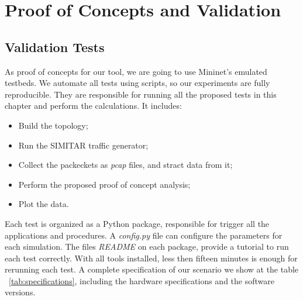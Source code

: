 \chapter{Proof of Concepts and Validation}\label{ch:validation}


\section{Validation Tests}


As proof of concepts for our tool, we are going to use Mininet's emulated testbeds. We automate all tests using scripts, so our experiments are fully reproducible. They are responsible for running all the proposed tests in this chapter and perform the calculations. It includes:

\begin{itemize}
    \item Build the topology;
    \item Run the SIMITAR traffic generator;
    \item Collect the packeckets as \textit{pcap} files, and stract data from it;
    \item Perform the proposed proof of concept analysis;
    \item Plot the data.
\end{itemize}

Each test is organized as a Python package, responsible for trigger all the applications and procedures. A \textit{config.py} file can configure the parameters for each simulation. The files \textit{README} on each package, provide a tutorial to run each test correctly. With all tools installed, less then fifteen minutes is enough for rerunning each test. A complete specification of our scenario we show at the table ~\ref{tab:specifications}, including the hardware specifications and the software versions. 

